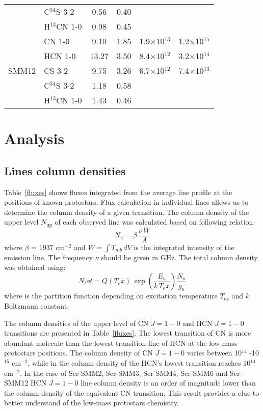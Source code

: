 \documentclass{aa}
\begin{document}
\begin{table*}
\begin{tabular}{l l c c c c}
{} & C$^{34}$S 3-2 & 0.56 & 0.40 &  & \\ 
{} & H$^{13}$CN 1-0 & 0.98 & 0.45 &  &\\ 
\hline
\multirow{5}{*}{SMM12} & CN 1-0 & 9.10 & 1.85 & 1.9$\times$10$^{13}$ & 1.2$\times$10$^{15}$\\
{} & HCN 1-0 & 13.27 & 3.50 & 8.4$\times$10$^{12}$ & 3.2$\times$10$^{14}$\\ 
{} & CS 3-2 & 9.75 & 3.26 & 6.7$\times$10$^{12}$ & 7.4$\times$10$^{13}$\\  
{} & C$^{34}$S 3-2 & 1.18 & 0.58 &  &\\ 
{} & H$^{13}$CN 1-0 & 1.43 & 0.46 & & \\ 
\hline
\end{tabular}
\end{table*}

\section{Analysis}

\subsection{Lines column densities}

Table~\ref{fluxes} shows fluxes integrated from the average line profile at the positions of known protostars. 
Flux calculation in individual lines allows us to determine the column density of a given transition. The column density of the upper level $N_\mathrm{up}$ of each observed line was calculated based on following relation:
\begin{equation} \label{eq1}
N_u = \beta \, \frac{\nu \, W}{A}
\end{equation}
where $\beta$ = 1937 cm$^{-2}$ and $W = \int{T_{mb} \, dV}$ is the integrated intensity of the emission line. The frequency $\nu$ should be given in GHz. The total column density was obtained using:
\begin{equation} \label{eq2}
N_tot = Q(T_ex) \, \exp(\frac{E_u }{k \, T_ex })  \frac{N_u }{g_u }
\end{equation}
where is the partition function depending on excitation temperature $T_\mathrm{ex}$ and $k$ Boltzmann constant.

The column densities of the upper level of CN $J=1-0$ and HCN $J=1-0$ transitions are presented in Table~\ref{fluxes}. The lowest transition of CN is more abundant molecule than the lowest transition line of HCN at the low-mass protostars positions. The column density of CN $J=1-0$ varies between 10$^{14}$ -10$^{15}$ cm$^{-2}$, while in the column density of the HCN’s lowest transition reaches 10$^{14}$ cm$^{-2}$. In the case of Ser-SMM2, Ser-SMM3, Ser-SMM4, Ser-SMM6 and Ser-SMM12 HCN $J=1-0$ line column density is an order of magnitude lower than the column density of the equivalent CN transition. This result provides a clue to better understand of the low-mass protostars chemistry. 
\end{document}
